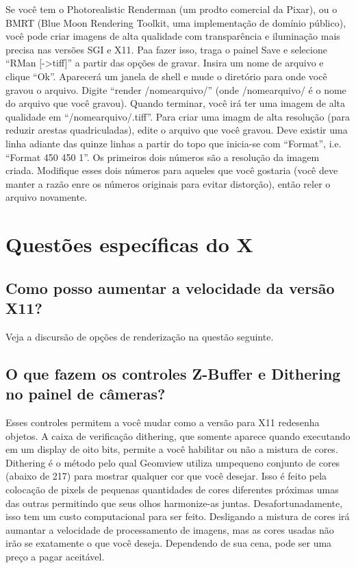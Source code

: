 \documentclass[12pt,a4paper]{article}
\begin{document}
        Se voc\^e tem o Photorealistic Renderman (um prodto comercial da Pixar), ou
        o BMRT (Blue Moon Rendering Toolkit, uma implementa\c{c}\~ao de dom\'inio p\'ublico), voc\^e
        pode criar imagens de alta qualidade com transpar\^encia e ilumina\c{c}\~ao
        mais precisa nas vers\~oes SGI e X11. Paa fazer isso, traga o painel Save
        e selecione ``RMan [->tiff]'' a partir das op\c{c}\~oes de gravar. Insira um nome de arquivo
        e clique  ``Ok''. Aparecer\'a um janela de shell e mude o diret\'{o}rio para onde
        voc\^e gravou o arquivo. Digite ``render /nomearquivo/'' (onde /nomearquivo/ \'e o nome
        do arquivo que voc\^e gravou). Quando terminar, voc\^e ir\'a ter uma imagem de alta qualidade
        em ``/nomearquivo/.tiff''. Para criar uma imagm de alta resolu\c{c}\~ao (para
        reduzir arestas quadriculadas), edite o arquivo que voc\^e gravou. Deve existir uma linha
        adiante das quinze linhas a partir do topo que inicia-se com ``Format'', i.e.
        ``Format 450 450 1''. Os primeiros dois n\'umeros s\~ao a resolu\c{c}\~ao da
        imagem criada. Modifique esses dois n\'umeros para aqueles que voc\^e gostaria (voc\^e deve manter a raz\~ao
        enre os n\'umeros originais para evitar distor\c{c}\~ao), ent\~ao reler o arquivo novamente.

\section{Quest\~oes espec\'ificas do X}

    \subsection{Como posso aumentar a velocidade da vers\~ao X11?}

        Veja a discurs\~ao de op\c{c}\~oes de renderiza\c{c}\~ao na quest\~ao seguinte.

    \subsection{O que fazem os controles Z-Buffer e Dithering no painel de c\^ameras?}

        Esses controles permitem a voc\^e mudar como a vers\~ao para X11 redesenha objetos.
        A caixa de verifica\c{c}\~ao dithering, que somente aparece quando executando em um display de
        oito bits, permite a voc\^e habilitar ou n\~ao a mistura de cores. Dithering \'e o
        m\'etodo pelo qual Geomview utiliza umpequeno conjunto de cores (abaixo de 217) para
        mostrar qualquer cor que voc\^e desejar. Isso \'e feito pela coloca\c{c}\~ao de pixels de pequenas quantidades
        de cores diferentes pr\'{o}ximas umas das outras permitindo que seus olhos harmonize-as
        juntas. Desafortunadamente, isso tem um custo computacional para ser feito.
        Desligando a mistura de cores ir\'a aumantar a velocidade de processamento de imagens, mas as cores usadas n\~ao ir\~ao
        se exatamente o que voc\^e deseja. Dependendo de sua cena, pode ser uma
        pre\c{c}o a pagar aceit\'avel.
\end{document}
